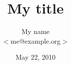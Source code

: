 \documentclass{beamer}
\title[My title]{My title}
\author{My name \\$<$me@example.org$>$}
\institute{http://www.example.org}
\date{May 22, 2010}
\begin{document}
\begin{frame}
\titlepage
\end{frame}
\end{document}
